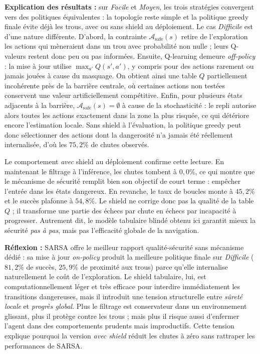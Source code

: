\documentclass{article}
\begin{document}
\textbf{Explication des résultats :} sur \textit{Facile} et \textit{Moyen}, les trois stratégies convergent vers des politiques équivalentes : la topologie reste simple et la politique greedy finale évite déjà les trous, avec ou sans shield au déploiement. Le cas \textit{Difficile} est d'une nature différente. D'abord, la contrainte $\mathcal{A}_{\text{safe}}(s)$ retire de l'exploration les actions qui mèneraient dans un trou avec probabilité non nulle ; leurs Q-valeurs restent donc peu ou pas informées. Ensuite, Q-learning demeure \textit{off-policy} : la mise à jour utilise $\max_{a'} Q(s',a')$, y compris pour des actions rarement ou jamais jouées à cause du masquage. On obtient ainsi une table $Q$ partiellement incohérente près de la barrière centrale, où certaines actions non testées conservent une valeur artificiellement compétitive. Enfin, pour plusieurs états adjacents à la barrière, $\mathcal{A}_{\text{safe}}(s)=\emptyset$ à cause de la stochasticité : le repli autorise alors toutes les actions exactement dans la zone la plus risquée, ce qui détériore encore l'estimation locale. Sans shield à l'évaluation, la politique greedy peut donc sélectionner des actions dont la dangerosité n'a jamais été réellement internalisée, d'où les $75{,}2\%$ de chutes observés.

Le comportement \textit{avec} shield au déploiement confirme cette lecture. En maintenant le filtrage à l'inférence, les chutes tombent à $0{,}0\%$, ce qui montre que le mécanisme de sécurité remplit bien son objectif de court terme : empêcher l'entrée dans les états dangereux. En revanche, le taux de boucles monte à $45{,}2\%$ et le succès plafonne à $54{,}8\%$. Le shield ne corrige donc pas la qualité de la table $Q$ ; il transforme une partie des échecs par chute en échecs par incapacité à progresser. Autrement dit, le modèle tabulaire blindé obtenu ici garantit mieux la sécurité \emph{pas à pas}, mais pas l'efficacité globale de la navigation.

\textbf{Réflexion :} SARSA offre le meilleur rapport qualité-sécurité sans mécanisme dédié : sa mise à jour \textit{on-policy} produit la meilleure politique finale sur \textit{Difficile} ($81{,}2\%$ de succès, $25{,}9\%$ de proximité aux trous) parce qu'elle internalise naturellement le coût de l'exploration. Le shield tabulaire, lui, est computationnellement léger et très efficace pour interdire immédiatement les transitions dangereuses, mais il introduit une tension structurelle entre \emph{sûreté locale} et \emph{progrès global}. Plus le filtrage est conservateur dans un environnement glissant, plus il protège contre les trous ; mais plus il risque aussi d'enfermer l'agent dans des comportements prudents mais improductifs. Cette tension explique pourquoi la version \emph{avec shield} réduit les chutes à zéro sans rattraper les performances de SARSA.
\end{document}
